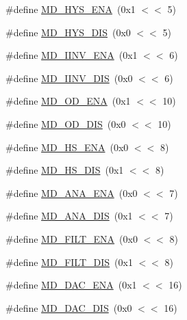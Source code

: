 \begin{DoxyCompactItemize}
\item 
\#define \hyperlink{group___i_o_c_o_n__17_x_x__40_x_x_gab6a440afbad506dec9b0227f3c82fd73}{M\+D\+\_\+\+H\+Y\+S\+\_\+\+E\+N\+A}~(0x1 $<$$<$ 5)
\item 
\#define \hyperlink{group___i_o_c_o_n__17_x_x__40_x_x_ga7c49147e8696b77ebf4bea2d90474a7f}{M\+D\+\_\+\+H\+Y\+S\+\_\+\+D\+I\+S}~(0x0 $<$$<$ 5)
\item 
\#define \hyperlink{group___i_o_c_o_n__17_x_x__40_x_x_gaeecb9c3d257aaea0fff788e1cdd538bb}{M\+D\+\_\+\+I\+I\+N\+V\+\_\+\+E\+N\+A}~(0x1 $<$$<$ 6)
\item 
\#define \hyperlink{group___i_o_c_o_n__17_x_x__40_x_x_ga3f1345e7ffe3eed8bb0c4b9e456b0df9}{M\+D\+\_\+\+I\+I\+N\+V\+\_\+\+D\+I\+S}~(0x0 $<$$<$ 6)
\item 
\#define \hyperlink{group___i_o_c_o_n__17_x_x__40_x_x_ga83e1ce8c76aac6481562dd26b059ae61}{M\+D\+\_\+\+O\+D\+\_\+\+E\+N\+A}~(0x1 $<$$<$ 10)
\item 
\#define \hyperlink{group___i_o_c_o_n__17_x_x__40_x_x_ga1b2a7926f85c2e7fddf784ed9a692d33}{M\+D\+\_\+\+O\+D\+\_\+\+D\+I\+S}~(0x0 $<$$<$ 10)
\item 
\#define \hyperlink{group___i_o_c_o_n__17_x_x__40_x_x_ga95de7405f0be07e5a3c1eac75663b7e4}{M\+D\+\_\+\+H\+S\+\_\+\+E\+N\+A}~(0x0 $<$$<$ 8)
\item 
\#define \hyperlink{group___i_o_c_o_n__17_x_x__40_x_x_gaa9af2984b24150d8c005e2b7c254adbc}{M\+D\+\_\+\+H\+S\+\_\+\+D\+I\+S}~(0x1 $<$$<$ 8)
\item 
\#define \hyperlink{group___i_o_c_o_n__17_x_x__40_x_x_ga981e8fc7f82693378a8856bea0b435b7}{M\+D\+\_\+\+A\+N\+A\+\_\+\+E\+N\+A}~(0x0 $<$$<$ 7)
\item 
\#define \hyperlink{group___i_o_c_o_n__17_x_x__40_x_x_ga12c40f516d771be23c8521a59e8f37dd}{M\+D\+\_\+\+A\+N\+A\+\_\+\+D\+I\+S}~(0x1 $<$$<$ 7)
\item 
\#define \hyperlink{group___i_o_c_o_n__17_x_x__40_x_x_ga0bbfc0ef84fc75d356d7fd36cd23527e}{M\+D\+\_\+\+F\+I\+L\+T\+\_\+\+E\+N\+A}~(0x0 $<$$<$ 8)
\item 
\#define \hyperlink{group___i_o_c_o_n__17_x_x__40_x_x_gad67d4495f8a8568bdedbaa13aceb2d3d}{M\+D\+\_\+\+F\+I\+L\+T\+\_\+\+D\+I\+S}~(0x1 $<$$<$ 8)
\item 
\#define \hyperlink{group___i_o_c_o_n__17_x_x__40_x_x_ga6b38cbeca37aeb7bcbf7fc66ba4ec65d}{M\+D\+\_\+\+D\+A\+C\+\_\+\+E\+N\+A}~(0x1 $<$$<$ 16)
\item 
\#define \hyperlink{group___i_o_c_o_n__17_x_x__40_x_x_gaec6eb0c4c1101d5c5dc64ef56a5a5588}{M\+D\+\_\+\+D\+A\+C\+\_\+\+D\+I\+S}~(0x0 $<$$<$ 16)

\end{DoxyCompactItemize}
